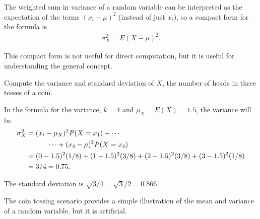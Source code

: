 The weighted sum in variance of a random variable can be interpreted as the expectation of the terms $(x_i - \mu)^2$ (instead of just $x_i$), so a compact form for the formula is 
\begin{align*}
	 \sigma_X^2 = E(X - \mu)^2.
\end{align*}

This compact form is not useful for direct computation, but it is useful for understanding the general concept. 

\begin{example}{Compute the variance and standard deviation of $X$, the number of heads in three tosses of a coin.}
    
    In the formula for the variance, $k = 4$ and $\mu_X = E(X) = 1.5$, the variance will be 
    \begin{align}
    \sigma_X^2 &= (x_i-\mu_X)^2P(X=x_1) + \cdots \notag \\
    	& \qquad\quad\cdots+ (x_4-\mu)^2 P(X=x_4) \notag \\
    	&= (0- 1.5)^2(1/8) + (1 - 1.5)^2 (3/8) + 
        (2 -1.5)^2 (3/8) + (3-1.5)^2 (1/8) \notag \\
        &= 3/4 = 0.75.
    \end{align}
    
The standard deviation is $\sqrt{3/4} = \sqrt{3}/2 = 0.866$.  

\end{example}

The coin tossing scenario provides a simple illustration of the mean and variance of a random variable, but it is artificial. 

